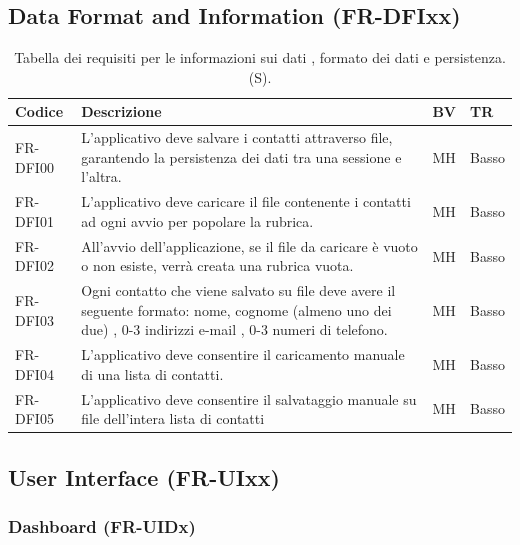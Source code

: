 \documentclass[a4paper,12pt]{article}
\begin{document}
    \subsection{Data Format and Information (FR-DFIxx)}
    \begin{table}[H]
        \centering
        \begin{tabular}{|l|p{8cm}|l|l|}
            \hline
            \textbf{Codice} & \textbf{Descrizione} & \textbf{BV} & \textbf{TR} \\
            \hline
            FR-DFI00 & L'applicativo deve salvare i contatti attraverso file, garantendo la persistenza dei dati tra una sessione e l'altra. & MH & Basso \\
            \hline
            FR-DFI01 & L'applicativo deve caricare il file contenente i contatti ad ogni avvio per popolare la rubrica. & MH & Basso \\
            \hline
            FR-DFI02 & All'avvio dell'applicazione, se il file da caricare è vuoto o non esiste, verrà creata una rubrica vuota. & MH & Basso \\
            \hline
            FR-DFI03 & Ogni contatto che viene salvato su file deve avere il seguente formato: nome, cognome (almeno uno dei due) , 0-3 indirizzi e-mail , 0-3 numeri di telefono. & MH & Basso \\
            \hline
            FR-DFI04 & L'applicativo deve consentire il caricamento manuale di una lista di contatti. & MH & Basso \\ \hline
            FR-DFI05 & L'applicativo deve consentire il salvataggio manuale su file dell'intera lista di contatti & MH & Basso \\ \hline
        \end{tabular}
        \caption{Tabella dei requisiti per le informazioni sui dati , formato dei dati e persistenza. (S).}
    \end{table}
    \subsection{User Interface (FR-UIxx)}
    \subsubsection{Dashboard (FR-UIDx)}
\end{document}
